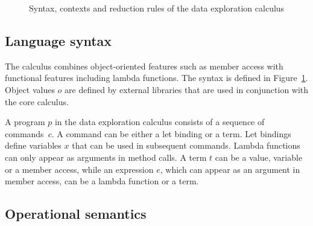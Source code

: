 \documentclass[english,submission]{programming}
\theoremstyle{plain}
\theoremstyle{definition}
\begin{document}
\begin{figure}
\vspace{-0.5em}
\caption{Syntax, contexts and reduction rules of the data exploration calculus}
\label{fig:dec-calculus}
\vspace{-0.5em}
\end{figure}


\subsection{Language syntax}
The calculus combines object-oriented features such as member access with functional features
including lambda functions. The syntax is defined in Figure~\ref{fig:dec-calculus}. Object values
$o$ are defined by external libraries that are used in conjunction with the core calculus.

A program $p$ in the data exploration calculus consists of a sequence of commands~$c$. A command
can be either a let binding or a term. Let bindings define variables $x$ that can be used in
subsequent commands. Lambda functions
can only appear as arguments in method calls. A term $t$ can be a value, variable or a
member access, while an expression $e$, which can appear as an argument in member access,
can be a lambda function or a term.


\subsection{Operational semantics}
\label{sec:calculus-semantics}
\end{document}
